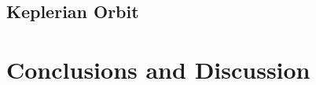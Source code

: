 \documentclass[12pt,preprint]{aastex}
\begin{document}
\subsection{Keplerian Orbit}\label{Sec:Kepler}

\section{Conclusions and Discussion}\label{Sec:Conclusions and Discussion}


\acknowledgments


\clearpage

%
%
\end{document}
